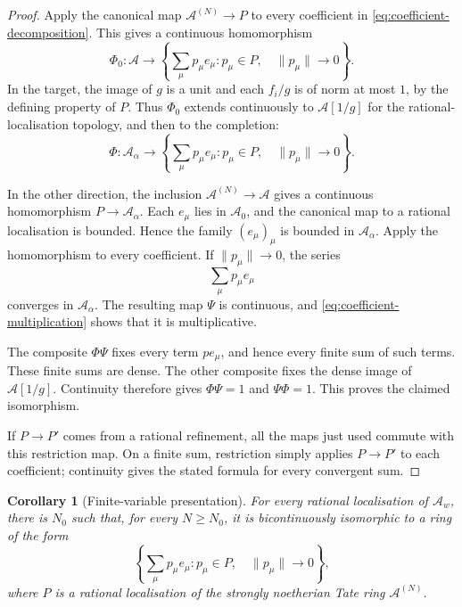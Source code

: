 \documentclass[11pt,reqno]{amsart}
\newtheorem{corollary}[corollary]{Corollary}
\theoremstyle{definition}
\begin{document}
\begin{proof}
Apply the canonical map $\mathcal A^{(N)}\to P$ to every coefficient in
\eqref{eq:coefficient-decomposition}.  This gives a continuous homomorphism
\[
  \Phi_0:\mathcal A\longrightarrow
  \left\{
    \sum_\mu p_\mu e_\mu:
    p_\mu\in P,\quad \lVert p_\mu\rVert\longrightarrow0
  \right\}.
\]
In the target, the image of $g$ is a unit and each $f_i/g$ is
of norm at most $1$, by the defining property of $P$.  Thus $\Phi_0$
extends continuously to $\mathcal A[1/g]$ for the rational-localisation
topology, and then to the completion:
\[
  \Phi:\mathcal A_\alpha\longrightarrow
  \left\{
    \sum_\mu p_\mu e_\mu:
    p_\mu\in P,\quad \lVert p_\mu\rVert\longrightarrow0
  \right\}.
\]

In the other direction, the inclusion
$\mathcal A^{(N)}\to\mathcal A$ gives a continuous homomorphism
$P\to\mathcal A_\alpha$.  Each $e_\mu$ lies in $\mathcal A_0$, and the
canonical map to a rational localisation is bounded.  Hence the family
$(e_\mu)_\mu$ is bounded in $\mathcal A_\alpha$.  Apply the homomorphism to
every coefficient.  If
$\lVert p_\mu\rVert\to0$, the series
\[
  \sum_\mu p_\mu e_\mu
\]
converges in $\mathcal A_\alpha$.  The resulting map $\Psi$ is continuous,
and \eqref{eq:coefficient-multiplication} shows that it is multiplicative.

The composite $\Phi\Psi$ fixes every term $p e_\mu$, and hence every
finite sum of such terms.  These finite sums are dense.  The other composite
fixes the dense image of $\mathcal A[1/g]$.  Continuity therefore gives
$\Phi\Psi=1$ and $\Psi\Phi=1$.  This proves the claimed isomorphism.

If $P\to P'$ comes from a rational refinement, all the maps just used
commute with this restriction map.  On a finite sum, restriction simply
applies $P\to P'$ to each coefficient; continuity gives the stated formula
for every convergent sum.
\end{proof}

\begin{corollary}[Finite-variable presentation]\label{cor:finite-variable-presentation}
For every rational localisation of $\mathcal A_w$, there is $N_0$ such that,
for every $N\geq N_0$, it is bicontinuously isomorphic to a ring of the form
\[
  \left\{
    \sum_\mu p_\mu e_\mu:
    p_\mu\in P,\quad \lVert p_\mu\rVert\longrightarrow0
  \right\},
\]
where $P$ is a rational localisation of the strongly noetherian Tate ring
$\mathcal A^{(N)}$.
\end{corollary}
\end{document}
